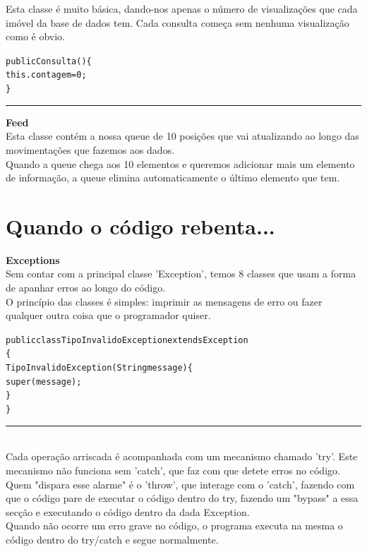 \documentclass[12pt]{article}
\newenvironment{code}                    
{\textbf{
} \hspace{1cm} \hrulefill \\ 
\smallskip 
\begin{center}
\begin{minipage}{0.9\textwidth} 
\begin{alltt}\small}
{\end{alltt}
\end{minipage}
\end{center}
\hrule\smallskip
}
\begin{document}
Esta classe é muito básica, dando-nos apenas o número de visualizações que cada imóvel da base de dados tem.
Cada consulta começa sem nenhuma visualização como é obvio.
\begin{code}
public Consulta()\{
        this.contagem = 0;
    \}
\end{code}


\textbf{Feed}
\newline
~\\

Esta classe contém a nossa queue de 10 posições que vai atualizando ao longo das movimentações que fazemos aos dados.
~\\

Quando a queue chega aos 10 elementos e queremos adicionar mais um elemento de informação, a queue elimina automaticamente o último elemento que tem.
\pagebreak

\section{Quando o código rebenta...}

\textbf{Exceptions}
\newline
~\\

Sem contar com a principal classe 'Exception', temos 8 classes que usam a forma de apanhar erros ao longo do código.
\\

O princípio das classes é simples: imprimir as mensagens de erro ou fazer qualquer outra coisa que o programador quiser.
\newline
\begin{code}
public class TipoInvalidoException extends Exception
\{
    TipoInvalidoException(String message)\{
       super(message);
    \}
\}
\end{code}
~\\

Cada operação arriscada é acompanhada com um mecanismo chamado 'try'. Este mecanismo não funciona sem 'catch', que faz com que detete erros no código. Quem "dispara esse alarme" é o 'throw', que interage com o 'catch', fazendo com que o código pare de executar o código dentro do try, fazendo um "bypass" a essa secção e executando o código dentro da dada Exception. 
~\\

Quando não ocorre um erro grave no código, o programa executa na mesma o código dentro do try/catch e segue normalmente.  
\end{document}
